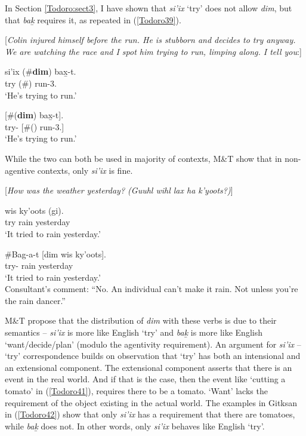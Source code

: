 \documentclass[output=paper]{langscibook}
\begin{document}
In Section \ref{Todoro:sect3}, I have shown that \emph{si’ix} ‘try’ does not allow \emph{dim}, but that \emph{bak̲} requires it, as repeated in (\ref{Todoro39}). 

\begin{exe}
\ex \label{Todoro39} [\emph{Colin injured himself before the run. He is stubborn and decides 
    to try anyway. We are watching the race and I spot him trying to     
   run, limping along. I tell you}:] \\
\begin{xlist}

\ex \label{Todoro39a}
	{si'ix} 	(\#{\textbf{dim}}) 	{bax̱-t}.	  \\
  	try	(\#)	run-3.{\seriesII} \\
\glt `He’s trying to run.' 

\ex \label{Todoro39b}
	[\#({\textbf{dim}}) 	{bax̱-t}]. \\
    try-	[\#()	run-3.{\seriesII}]\\
\glt `He’s trying to run.' 
\end{xlist}
\end{exe}

While the two can both be used in majority of contexts, M\&T show that in non-agentive contexts, only \emph{si’ix} is fine. 

\begin{exe}
\ex \label{Todoro40} [\emph{How was the weather yesterday? (Guuhl wihl lax ha k'yoots?)}]
\begin{xlist}

\ex \label{Todoro40a}
 	{wis} 	{ky’oots} 	({gi}). \\
   try	rain	yesterday	 \\
\glt `It tried to rain yesterday.' 

\ex \label{Todoro40b}
\gll \#{Bag-a-t} 	[{dim} 	{wis} 	{ky’oots}]. \\
   try- 		rain	yesterday\\
\glt `It tried to rain yesterday.' \\ {Consultant’s comment:} “No. An individual can’t make it rain. Not unless you’re the rain dancer.”
\end{xlist}
\end{exe}

M\&T propose that the distribution of \emph{dim} with these verbs is due to their semantics – \emph{si’ix} is more like English `try' and \emph{bak̲} is more like English `want/decide/plan’ (modulo the agentivity requirement). An argument for \emph{si’ix} – ‘try’ correspondence builds on \citet{sharvit2003a} observation that ‘try’ has both an intensional and an extensional component. The extensional component asserts that there is an event in the real world. And if that is the case, then the event like ‘cutting a tomato’ in (\ref{Todoro41}), requires there to be a tomato. ‘Want’ lacks the requirement of the object existing in the actual world. The examples in Gitksan in (\ref{Todoro42}) show that only \emph{si’ix} has a requirement that there are tomatoes, while \emph{bak̲} does not. In other words, only \emph{si’ix} behaves like English ‘try’.
\end{document}
